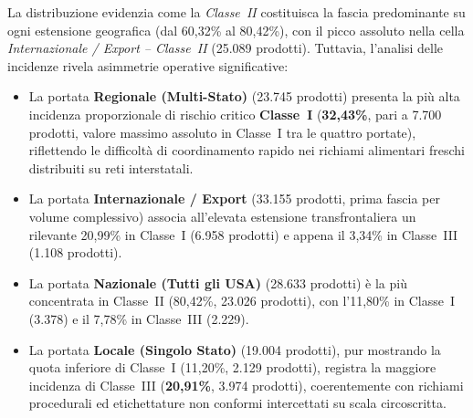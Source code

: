 La distribuzione evidenzia come la \textit{Classe~II} costituisca la fascia predominante su ogni estensione geografica (dal 60,32\% al 80,42\%), con il picco assoluto nella cella \textit{Internazionale / Export -- Classe~II} (25.089 prodotti). Tuttavia, l'analisi delle incidenze rivela asimmetrie operative significative:
\begin{itemize}
    \item La portata \textbf{Regionale (Multi-Stato)} (23.745 prodotti) presenta la più alta incidenza proporzionale di rischio critico \textbf{Classe~I} (\textbf{32,43\%}, pari a 7.700 prodotti, valore massimo assoluto in Classe~I tra le quattro portate), riflettendo le difficoltà di coordinamento rapido nei richiami alimentari freschi distribuiti su reti interstatali.
    \item La portata \textbf{Internazionale / Export} (33.155 prodotti, prima fascia per volume complessivo) associa all'elevata estensione transfrontaliera un rilevante 20,99\% in Classe~I (6.958 prodotti) e appena il 3,34\% in Classe~III (1.108 prodotti).
    \item La portata \textbf{Nazionale (Tutti gli USA)} (28.633 prodotti) è la più concentrata in Classe~II (80,42\%, 23.026 prodotti), con l'11,80\% in Classe~I (3.378) e il 7,78\% in Classe~III (2.229).
    \item La portata \textbf{Locale (Singolo Stato)} (19.004 prodotti), pur mostrando la quota inferiore di Classe~I (11,20\%, 2.129 prodotti), registra la maggiore incidenza di Classe~III (\textbf{20,91\%}, 3.974 prodotti), coerentemente con richiami procedurali ed etichettature non conformi intercettati su scala circoscritta.
\end{itemize}

